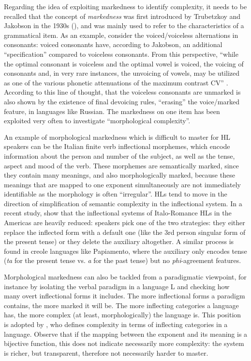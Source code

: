 \documentclass[output=paper]{langscibook}
\begin{document}
Regarding the idea of exploiting markedness to identify complexity, it needs to be recalled that the concept of \textit{markedness} was first introduced by Trubetzkoy and Jakobson in the 1930s (\citealt{Trubetzkoy31, Trubetzkoy39, Jakobson32, Jakobson39}), and was mainly used to refer to the characteristics of a grammatical item. As an example, consider the voiced/voiceless alternations in consonants: voiced consonants have, according to Jakobson, an additional “specification” compared to voiceless consonants. From this perspective, “while the optimal consonant is voiceless and the optimal vowel is voiced, the voicing of consonants and, in very rare instances, the unvoicing of vowels, may be utilized as one of the various phonetic attenuations of the maximum contrast CV” \citep[56--57]{JakobsonHalle56}. According to this line of thought, that the voiceless consonants are unmarked is also shown by the existence of final devoicing rules, ``erasing'' the voice\slash marked feature, in languages like Russian. The markedness on one item has been exploited very often to investigate ``morphological complexity''. 

An example of morphological markedness which is difficult to master for HL speakers can be the Italian finite verb inflectional morphemes, which encode information about the person and number of the subject, as well as the tense, aspect and mood of the verb. These morphemes are semantically marked, since they contain many meanings, and also morphologically marked, because these meanings that are mapped to one exponent simultaneously are not immediately identifiable as the morphology is often ``irregular''. HLs tend to move in the direction of simplification of semantic complexity in the inflectional system. In a recent study, \citet{AndrianiDAlessandro22} show that the inflectional systems of Italo-Romance HLs in the Americas are heavily reduced: speakers pick one of the two strategies: they either replace the inflected form with a default one (like the 3rd person singular form of the present tense) or they delete the auxiliary altogether. A similar process is found in creole languages like Papiamento, where the auxiliary only encodes tense (\textit{ta} for the present tense vs. \textit{a} for the past tense) but no \textit{phi}-agreement features.

Morphological markedness can also be tackled from a paradigmatic viewpoint, for instance by isolating the verbal paradigm in a language L and checking how many overt inflectional forms it includes. The more inflectional forms a paradigm contains, the more marked it will be. The more inflecting categories a language has, the more complex (at least, morphologically) the language is. This position is adopted by \citet{nichols1992}, who defines complexity in terms of inflecting categories in a language. 
Observe that if the mapping between the exponent and its meaning is a bijective function, this does not indicate necessarily more complexity: the system is richer, but transparent, therefore not necessarily harder to master. 
\end{document}
